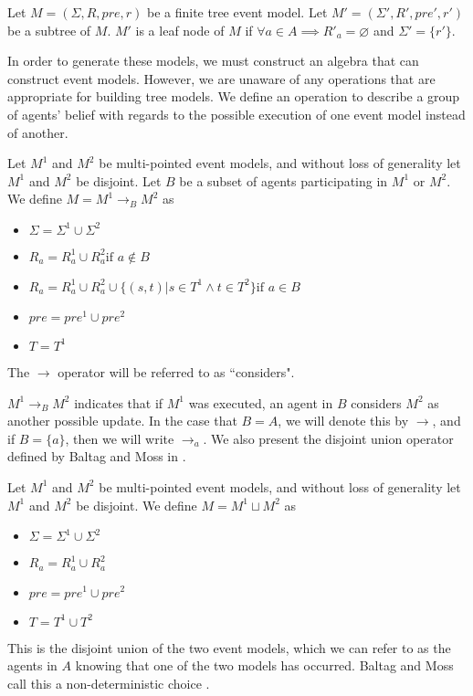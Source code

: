 \begin{defn} \label{leaf}
Let $M = (\Sigma, R, pre, r)$ be a finite tree event model.
Let $M' = (\Sigma', R', pre', r')$ be a subtree of $M$.
$M'$ is a leaf node of $M$ if $\forall a \in A \implies R'_a = \varnothing$ and $\Sigma' = \{ r'\}$.
\end{defn}

In order to generate these models, we must construct an algebra that can construct event models.
However, we are unaware of any operations that are appropriate for building tree models.
We define an operation to describe a group of agents' belief with regards to the possible execution
of one event model instead of another.

\begin{defn} \label{considers}
Let $M^1$ and $M^2$ be multi-pointed event models, and without loss of
generality let $M^1$ and $M^2$ be disjoint.
Let $B$ be a subset of agents participating in $M^1$ or $M^2$.
We define $M = M^1 \to_B M^2$ as 
\begin{itemize}
  \item $\Sigma = \Sigma^1 \cup \Sigma^2$
  \item $R_a = R^1_a \cup R^2_a \text{if } a \notin B$
	\item $R_a =
      R^1_a \cup
      R^2_a \cup
      \{(s,t) | s \in T^1 \land t \in T^2 \}
    \text{if } a \in B $
  \item $pre = pre^1 \cup pre^2$
  \item $T = T^1$
\end{itemize}
The $\to$ operator will be referred to as ``considers".
\end{defn}

$M^1 \to_B M^2$ indicates that if $M^1$ was executed, an agent in $B$ considers $M^2$ as another
possible update.
In the case that $B = A$, we will denote this by $\to$, and if $B = \{a\}$, then
we will write $\to_a$.
We also present the disjoint union operator defined by Baltag and Moss in \cite{baltag2005programs}.

\begin{defn} \label{disjoint}
Let $M^1$ and $M^2$ be multi-pointed event models, and without loss of generality let $M^1$ and
$M^2$ be disjoint.
We define $M = M^1 \sqcup M^2$ as
\begin{itemize}
	\item $\Sigma = \Sigma^1 \cup \Sigma^2$
	\item $R_a = R^1_a \cup R^2_a$
	\item $pre = pre^1 \cup pre^2$
	\item $T = T^1 \cup T^2$
\end{itemize}
\end{defn}
This is the disjoint union of the two event models, which we can refer to as the agents in $A$
knowing that one of the two models has occurred.
Baltag and Moss call this a non-deterministic choice \cite{baltag2005programs}.

